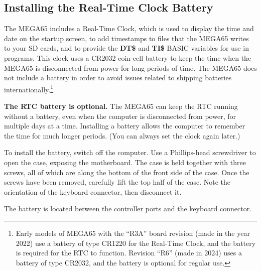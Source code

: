 \subsection{Installing the Real-Time Clock Battery}

The MEGA65 includes a Real-Time Clock, which is used to display the time and date on the startup screen, to add timestamps to files that the MEGA65 writes to your SD cards, and to provide the {\bf DT\$} and {\bf TI\$} BASIC variables for use in programs. This clock uses a CR2032 coin-cell battery to keep the time when the MEGA65 is disconnected from power for long periods of time. The MEGA65 does not include a battery in order to avoid issues related to shipping batteries internationally.\footnote{Early models of MEGA65 with the ``R3A'' board revision (made in the year 2022) use a battery of type CR1220 for the Real-Time Clock, and the battery is required for the RTC to function. Revision ``R6'' (made in 2024) uses a battery of type CR2032, and the battery is optional for regular use.}

{\bf The RTC battery is optional.} The MEGA65 can keep the RTC running without a battery, even when the computer is disconnected from power, for multiple days at a time. Installing a battery allows the computer to remember the time for much longer periods. (You can always set the clock again later.)

To install the battery, switch off the computer. Use a Phillips-head screwdriver to open the case, exposing the motherboard. The case is held together with three screws, all of which are along the bottom of the front side of the case. Once the screws have been removed, carefully lift the top half of the case. Note the orientation of the keyboard connector, then disconnect it.

The battery is located between the controller ports and the keyboard connector.

